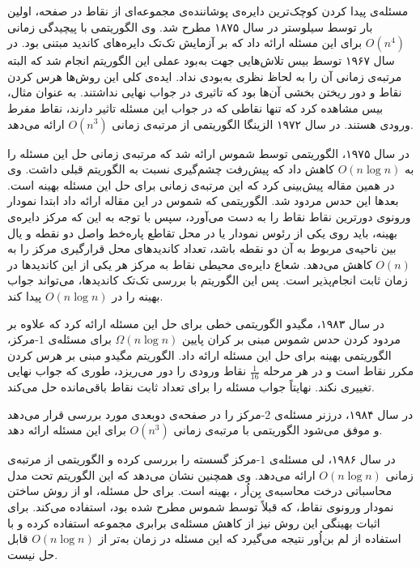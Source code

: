 
مسئله‌ی پیدا کردن کوچک‌ترین دایره‌ی پوشاننده‌ی مجموعه‌ای از نقاط در صفحه، اولین بار توسط سیلوستر  در سال ۱۸۷۵ مطرح شد. وی الگوریتمی با پیچیدگی زمانی $O(n^4)$ برای این مسئله ارائه داد که بر آزمایش تک‌تک دایره‌های کاندید مبتنی بود. در سال ۱۹۶۷ توسط بیس  تلاش‌هایی جهت به‌بود عملی این الگوریتم انجام شد که البته مرتبه‌ی زمانی آن را به لحاظ نظری به‌بودی نداد. ایده‌ی کلی این روش‌ها هرس کردن نقاط و دور ریختن بخشی آن‌ها بود که تاثیری در جواب نهایی نداشتند. به عنوان مثال، بیس مشاهده کرد که تنها نقاطی که در جواب این مسئله تاثیر دارند، نقاط مفرط  ورودی هستند. در سال ۱۹۷۲ الزینگا  الگوریتمی از مرتبه‌ی زمانی $O(n^3)$ ارائه می‌دهد.

در سال ۱۹۷۵، الگوریتمی توسط شموس  ارائه شد که مرتبه‌ی زمانی حل این مسئله را به $O(n \log n)$ کاهش داد که پیش‌رفت چشم‌گیری نسبت به الگوریتم قبلی داشت. وی در همین مقاله پیش‌بینی کرد که این مرتبه‌ی زمانی برای حل این مسئله بهینه است. بعدها این حدس مردود شد. الگوریتمی که شموس در این مقاله ارائه داد ابتدا نمودار ورونوی  دورترین نقاط  نقاط را به دست می‌آورد، سپس با توجه به این که مرکز دایره‌ی بهینه، باید روی یکی از رئوس نمودار یا در محل تقاطع پاره‌خط واصل دو نقطه و یال بین ناحیه‌ی مربوط به آن دو نقطه باشد، تعداد کاندیدهای محل قرارگیری مرکز را به $O(n)$ کاهش می‌دهد. شعاع دایره‌ی محیطی نقاط به مرکز هر یکی از این کاندیدها در زمان ثابت انجام‌پذیر است. پس این الگوریتم با بررسی تک‌تک کاندیدها، می‌تواند جواب بهینه را در $O(n \log n)$ پیدا کند.

در سال ۱۹۸۳، مگیدو  الگوریتمی خطی برای حل این مسئله ارائه کرد که علاوه بر مردود کردن حدس شموس مبنی بر کران پایین $\Omega(n \log n)$ برای مسئله‌ی $1$-مرکز، الگوریتمی بهینه برای حل این مسئله ارائه داد. الگوریتم مگیدو مبنی بر هرس کردن مکرر نقاط است و در هر مرحله $\frac{1}{16}$ نقاط ورودی را دور می‌ریزد، طوری که جواب نهایی تغییری نکند. نهایتاً جواب مسئله را برای تعداد ثابت نقاط باقی‌مانده حل می‌کند.

در سال ۱۹۸۴، درزنر  مسئله‌ی $2$-مرکز را در صفحه‌ی دوبعدی مورد بررسی قرار می‌دهد و موفق می‌شود الگوریتمی با مرتبه‌ی زمانی $O(n^3)$ برای این مسئله ارائه دهد.

در سال ۱۹۸۶، لی مسئله‌ی $1$-مرکز گسسته را بررسی کرده و الگوریتمی از مرتبه‌ی زمانی $O(n \log n)$ ارائه می‌دهد. وی همچنین نشان می‌دهد که این الگوریتم تحت مدل محاسباتی درخت محاسبه‌ی بِن‌اُر ، بهینه است. برای حل مسئله، او از روش ساختن نمودار ورونوی نقاط، که قبلاً توسط شموس مطرح شده بود، استفاده می‌کند. برای اثبات بهینگی این روش نیز از کاهش مسئله‌ی برابری مجموعه استفاده کرده و با استفاده از لم بن‌اُور  نتیجه می‌گیرد که این مسئله در زمان به‌تر از $O(n \log n)$ قابل حل نیست.


